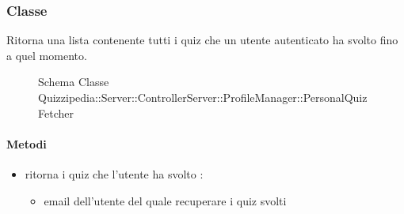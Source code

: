 \subsubsection{Classe }
Ritorna una lista contenente tutti i quiz che un utente autenticato ha svolto fino a quel momento.
\begin{figure}[H]
\centering
\noindent{}
\caption[Schema Classe PersonalQuizFetcher]{Schema Classe Quizzipedia::Server::ControllerServer::ProfileManager::PersonalQuizFetcher}
\end{figure}
\paragraph{Metodi}
\begin{itemize}
\item {}
\newline
ritorna i quiz che l'utente ha svolto
\newline
{} :
\begin{itemize}
\item {}
\newline
email dell'utente del quale recuperare i quiz svolti
\end{itemize}
\end{itemize}
